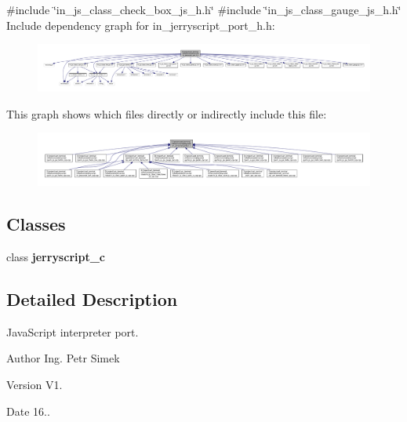 {\ttfamily \#include \char`\"{}in\+\_\+js\+\_\+class\+\_\+check\+\_\+box\+\_\+js\+\_\+h.\+h\char`\"{}}\newline
{\ttfamily \#include \char`\"{}in\+\_\+js\+\_\+class\+\_\+gauge\+\_\+js\+\_\+h.\+h\char`\"{}}\newline
Include dependency graph for in\+\_\+jerryscript\+\_\+port\+\_\+h.\+h\+:
\nopagebreak
\begin{figure}[H]
\begin{center}
\leavevmode
\includegraphics[width=350pt]{in__jerryscript__port__h_8h__incl}
\end{center}
\end{figure}
This graph shows which files directly or indirectly include this file\+:
\nopagebreak
\begin{figure}[H]
\begin{center}
\leavevmode
\includegraphics[width=350pt]{in__jerryscript__port__h_8h__dep__incl}
\end{center}
\end{figure}
\subsection*{Classes}
\begin{DoxyCompactItemize}
\item 
class \textbf{ jerryscript\+\_\+c}
\end{DoxyCompactItemize}


\subsection{Detailed Description}
Java\+Script interpreter port. 

\begin{DoxyAuthor}{Author}
Ing. Petr Simek 
\end{DoxyAuthor}
\begin{DoxyVersion}{Version}
V1. 
\end{DoxyVersion}
\begin{DoxyDate}{Date}
16.. 
\end{DoxyDate}
